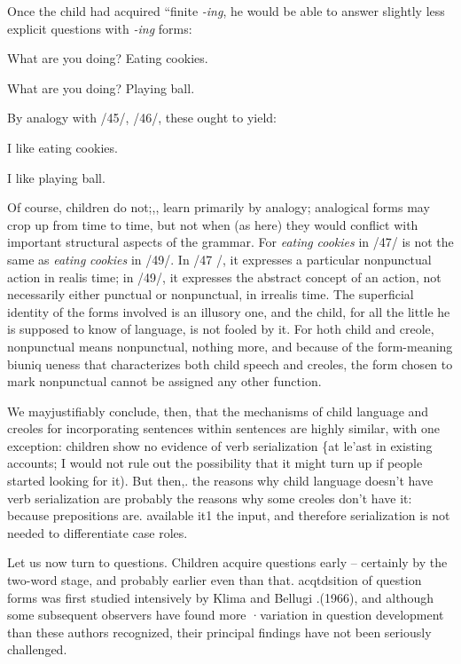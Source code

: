 Once the child had acquired ``finite \textit{{}-ing},\textit{{\textquotedbl}} he would be able to answer slightly less explicit questions with \textit{{}-ing} forms:

\ea\label{ex:47}
 What are you doing? Eating cookies.
\glt
\z

\ea\label{ex:48}
 What are you doing? Playing ball.
\glt
\z

By analogy with /45/, /46/, these ought to yield:

\ea\label{ex:49}
 I like eating cookies.
\glt
\z

\ea\label{ex:50}
 I like playing ball.
\glt
\z

Of course, children do not;,, learn primarily by analogy; analogical
forms may crop up from time to time, but not when (as here) they would conflict with important structural aspects of the grammar. For \textit{eating} \textit{cookies} in /47/ is not the same as \textit{eating} \textit{cookies} in /49/. In /47 /, it expresses a particular nonpunctual action in realis time; in /49/, it expresses the abstract concept of an action, not necessarily either punctual or nonpunctual, in irrealis time. The superficial identity of the forms involved is an illusory one, and the child, for all the little he is supposed to know of language, is not fooled by it. For hoth child and creole, nonpunctual means nonpunctual, nothing more, and be\-cause of the form-meaning biuniq ueness that characterizes both child speech and creoles, the form chosen to mark nonpunctual cannot be assigned any other function.

We mayjustifiably conclude, then, that the mechanisms of child
language and creoles for incorporating sentences within sentences are highly similar, with one exception: children show no evidence of verb serialization \{at le'ast in existing accounts; I would not rule out the possibility that it might turn up if people started looking for it). But then,. the reasons why child language doesn't have verb serialization are probably the reasons why some creoles don't have it: because prepositions are. available it1 the input, and therefore serialization is not needed to differentiate case roles.

Let us now turn to questions. Children acquire questions early --
certainly by the two-word stage, and probably earlier even than that. acqtdsition of question forms was first studied intensively by Klima and Bellugi .(1966), and although some subsequent observers have found more ·variation in question development than these authors recognized, their principal findings have not been seriously challenged.

